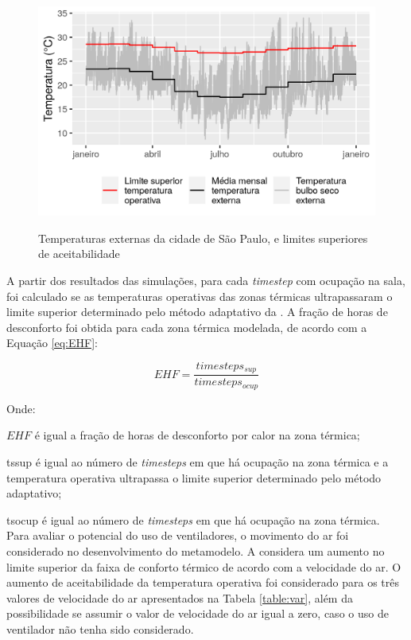 \documentclass[brazil,hardcopy,openany]{ufscthesis} %
\begin{document}
\begin{figure}[H]
	\centering
	\caption{Temperaturas externas da cidade de São Paulo, e limites superiores de aceitabilidade}
	\includegraphics[width=.8\linewidth]{img/temp_means.png}
	\label{fig:temp_means}
\end{figure}

A partir dos resultados das simulações, para cada \textit{timestep} com ocupação na sala, foi calculado se as temperaturas operativas das zonas térmicas ultrapassaram o limite superior determinado pelo método adaptativo da . A fração de horas de desconforto foi obtida para cada zona térmica modelada, de acordo com a Equação \ref{eq:EHF}:

\begin{equation}
\label{eq:EHF}
EHF = \frac{timesteps_{sup}}{timesteps_{ocup}}
\end{equation}

Onde:

$EHF$ é igual a fração de horas de desconforto por calor na zona térmica;

\gls{tssup} é igual ao número de \textit{timesteps} em que há ocupação na zona térmica e a temperatura operativa ultrapassa o limite superior determinado pelo método adaptativo;

\gls{tsocup} é igual ao número de \textit{timesteps} em que há ocupação na zona térmica.
\\

Para avaliar o potencial do uso de ventiladores, o movimento do ar foi considerado no desenvolvimento do metamodelo.
A  considera um aumento no limite superior da faixa de conforto térmico de acordo com a velocidade do ar.
O aumento de aceitabilidade da temperatura operativa foi considerado para os três valores de velocidade do ar apresentados na Tabela \ref{table:var}, além da possibilidade se assumir o valor de velocidade do ar igual a zero, caso o uso de ventilador não tenha sido considerado.
\end{document}
